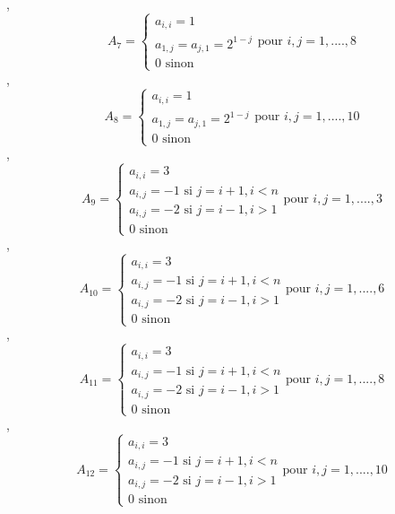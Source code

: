     ,\\
    \begin{equation*}
        A_7=
        \begin{cases}
            a_{i,i}=1 \\
            a_{1,j}=a_{j,1}=2^{1-j}\\
            0 \text{ sinon}
        \end{cases} \text{pour }i,j=1,....,8
    \end{equation*}
    ,\\
    \begin{equation*}
        A_8=
        \begin{cases}
            a_{i,i}=1 \\
            a_{1,j}=a_{j,1}=2^{1-j}\\
            0 \text{ sinon}
        \end{cases} \text{pour }i,j=1,....,10
    \end{equation*}
    ,\\
    \begin{equation*}
        A_9=
        \begin{cases}
            a_{i,i}=3 \\
            a_{i,j}=-1 \text{ si } j=i+1, i<n\\
            a_{i,j}=-2 \text{ si } j=i-1, i>1 \\
            0 \text{ sinon}
        \end{cases} \text{pour }i,j=1,....,3
    \end{equation*}
    ,\\
    \begin{equation*}
        A_{10}=
        \begin{cases}
            a_{i,i}=3 \\
            a_{i,j}=-1 \text{ si } j=i+1, i<n\\
            a_{i,j}=-2 \text{ si } j=i-1, i>1 \\
            0 \text{ sinon}
        \end{cases} \text{pour }i,j=1,....,6
    \end{equation*}
    ,\\
    \begin{equation*}
        A_{11}=
        \begin{cases}
            a_{i,i}=3 \\
            a_{i,j}=-1 \text{ si } j=i+1, i<n\\
            a_{i,j}=-2 \text{ si } j=i-1, i>1 \\
            0 \text{ sinon}
        \end{cases} \text{pour }i,j=1,....,8
    \end{equation*}
    ,\\
    \begin{equation*}
        A_{12}=
        \begin{cases}
            a_{i,i}=3 \\
            a_{i,j}=-1 \text{ si } j=i+1, i<n\\
            a_{i,j}=-2 \text{ si } j=i-1, i>1 \\
            0 \text{ sinon}
        \end{cases} \text{pour }i,j=1,....,10
    \end{equation*}